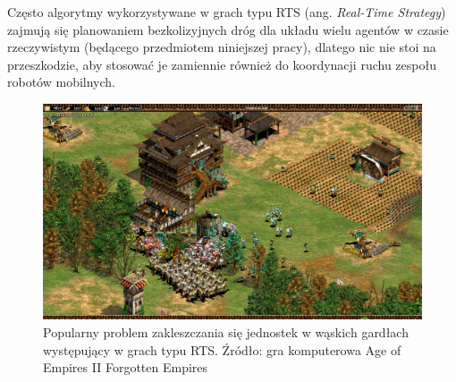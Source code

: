 Często algorytmy wykorzystywane w grach typu RTS (ang. {\it Real-Time Strategy}) zajmują się planowaniem bezkolizyjnych dróg dla układu wielu agentów w czasie rzeczywistym (będącego przedmiotem niniejszej pracy), dlatego nic nie stoi na przeszkodzie, aby stosować je zamiennie również do koordynacji ruchu zespołu robotów mobilnych.

\begin{figure}[H]
	\centering
	\includegraphics[width=1.0\columnwidth]{img/games/age-deadlock2}
	\caption{Popularny problem zakleszczania się jednostek w wąskich gardłach występujący w grach typu RTS. Źródło: gra komputerowa Age of Empires II Forgotten Empires}
	\label{fig:img_games_age-deadlock}
\end{figure}
